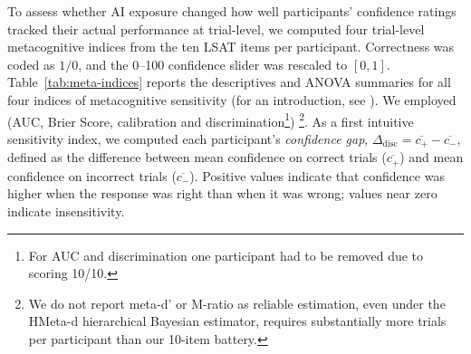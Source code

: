\documentclass[manuscript,review,anonymous]{acmart}
\begin{document}
To assess whether AI exposure changed how well participants' confidence ratings tracked their actual performance at trial-level, we computed four trial-level metacognitive indices from the ten LSAT items per participant. Correctness was coded as $1/0$, and the 0--100 confidence slider was rescaled to $[0,1]$. Table~\ref{tab:meta-indices} reports the descriptives and ANOVA summaries for all four indices of metacognitive sensitivity (for an introduction, see \citet{rahnev2025comprehensive}). We employed (AUC, Brier Score, calibration and discrimination\footnote{For AUC and discrimination one participant had to be removed due to scoring 10/10.}) \footnote{We do not report meta-d' or M-ratio as reliable estimation, even under the HMeta-d hierarchical Bayesian estimator, requires substantially more trials per participant than our 10-item battery.}. 
As a first intuitive sensitivity index, we computed each participant's
\emph{confidence gap}, $\Delta_{\text{disc}} = \overline{c_{+}} - \overline{c_{-}}$, defined as the difference between mean confidence on correct trials ($\overline{c_{+}}$) and mean confidence on incorrect trials ($\overline{c_{-}}$). Positive values indicate that confidence was higher when the response was right than when it was wrong; values near zero indicate insensitivity. %

\begin{table}[H]
\centering
\caption{One-way ANOVAs with descriptives by condition for the four
metacognitive indices. Values are means with standard deviations in
parentheses; all indices are computed at the individual level (one
value per participant) on a $[0,1]$ scale.}
\label{tab:meta-indices}
\end{table}
\end{document}

